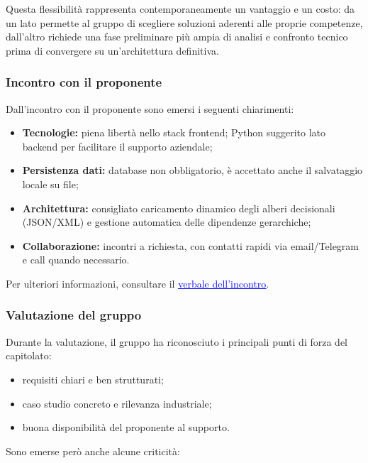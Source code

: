 \documentclass[a4paper,12pt]{article}
\begin{document}
Questa flessibilità rappresenta contemporaneamente un vantaggio e un costo: da un lato permette al gruppo di scegliere soluzioni aderenti alle proprie competenze, dall'altro richiede una fase preliminare più ampia di analisi e confronto tecnico prima di convergere su un'architettura definitiva.

\subsubsection{Incontro con il proponente}

Dall'incontro con il proponente sono emersi i seguenti chiarimenti:
\begin{itemize}
    \item \textbf{Tecnologie:} piena libertà nello stack frontend; Python suggerito lato backend per facilitare il supporto aziendale;
    \item \textbf{Persistenza dati:} database non obbligatorio, è accettato anche il salvataggio locale su file;
    \item \textbf{Architettura:} consigliato caricamento dinamico degli alberi decisionali (JSON/XML) e gestione automatica delle dipendenze gerarchiche;
    \item \textbf{Collaborazione:} incontri a richiesta, con contatti rapidi via email/Telegram e call quando necessario.
\end{itemize}

Per ulteriori informazioni, consultare il \href{https://alittlebyte-19.github.io/Documentazione/candidatura/verbali/Verbali%20Esterni/Verbale_Esterno_2026-03-17.pdf}{\textcolor{blue}{\underline{verbale dell'incontro}}}.

\subsubsection{Valutazione del gruppo}

Durante la valutazione, il gruppo ha riconosciuto i principali punti di forza del capitolato:

\begin{itemize}
    \item requisiti chiari e ben strutturati;
    \item caso studio concreto e rilevanza industriale;
    \item buona disponibilità del proponente al supporto.
\end{itemize}

Sono emerse però anche alcune criticità:
\end{document}
